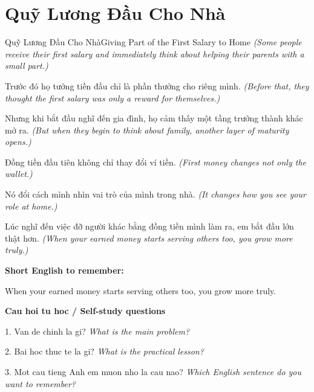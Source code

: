 \section{Quỹ Lương Đầu Cho Nhà}
\begin{truyen}{Quỹ Lương Đầu Cho Nhà}{Giving Part of the First Salary to Home}
\textit{(Some people receive their first salary and immediately think about helping their parents with a small part.)}

Trước đó họ tưởng tiền đầu chỉ là phần thưởng cho riêng mình.
\textit{(Before that, they thought the first salary was only a reward for themselves.)}

Nhưng khi bắt đầu nghĩ đến gia đình, họ cảm thấy một tầng trưởng thành khác mở ra.
\textit{(But when they begin to think about family, another layer of maturity opens.)}

Đồng tiền đầu tiên không chỉ thay đổi ví tiền.
\textit{(First money changes not only the wallet.)}

Nó đổi cách mình nhìn vai trò của mình trong nhà.
\textit{(It changes how you see your role at home.)}

\end{truyen}

\begin{baihoc}
Lúc nghĩ đến việc đỡ người khác bằng đồng tiền mình làm ra, em bắt đầu lớn thật hơn.
\textit{(When your earned money starts serving others too, you grow more truly.)}
\end{baihoc}

\begin{ghinhoanh}
\textbf{Short English to remember:}

When your earned money starts serving others too, you grow more truly.

\end{ghinhoanh}

\begin{tuhocnhanh}
\textbf{Cau hoi tu hoc / Self-study questions}

1. Van de chinh la gi? \textit{What is the main problem?}

2. Bai hoc thuc te la gi? \textit{What is the practical lesson?}

3. Mot cau tieng Anh em muon nho la cau nao? \textit{Which English sentence do you want to remember?}
\end{tuhocnhanh}
\ngancach

